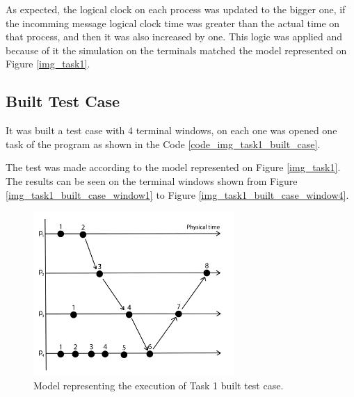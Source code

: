 \documentclass[a4paper, 11pt]{article}
\begin{document}
As expected, the logical clock on each process was updated to the bigger one, if the incomming message logical clock time was greater than the actual time on that process, and then it was also increased by one. This logic was applied and because of it the simulation on the terminals matched the model represented on Figure \ref{img_task1}.

\subsection*{Built Test Case}

It was built a test case with 4 terminal windows, on each one was opened one task of the program as shown in the Code \ref{code_img_task1_built_case}.

The test was made according to the model represented on Figure \ref{img_task1}. The results can be seen on the terminal windows shown from Figure \ref{img_task1_built_case_window1} to Figure \ref{img_task1_built_case_window4}.


\begin{figure}[h]
  \begin{center}
  \includegraphics[width=3in]{./imgs/task1_built_case_model.png}
  \caption{Model representing the execution of Task 1 built test case.}
  \label{img_task1_built_case_model}
  \end{center}
\end{figure}




\end{document}
